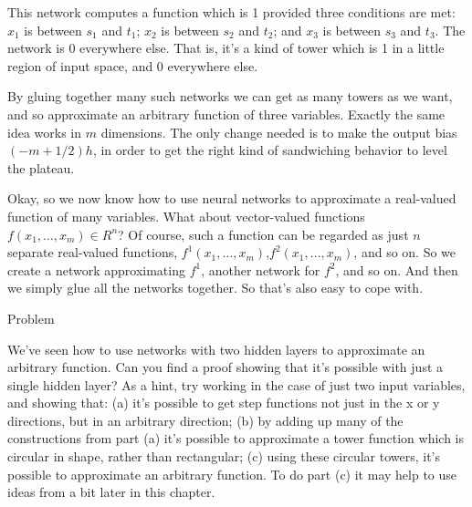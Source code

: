 \documentclass[a4paper,twoside,10pt]{book}
\begin{document}
This network computes a function which is 1 provided three conditions are met: $x_1$ is between $s_1$ and $t_1$; $x_2$ is between $s_2$ and $t_2$; and $x_3$ is between $s_3$ and $t_3$. The network is 0 everywhere else. That is, it's a kind of tower which is 1 in a little region of input space, and 0 everywhere else.

By gluing together many such networks we can get as many towers as we want, and so approximate an arbitrary function of three variables. Exactly the same idea works in $m$ dimensions. The only change needed is to make the output bias $(-m+1/2)h$, in order to get the right kind of sandwiching behavior to level the plateau.

Okay, so we now know how to use neural networks to approximate a real-valued function of many variables. What about vector-valued functions $f(x_1,\ldots,x_m)\in R^n$? Of course, such a function can be regarded as just $n$ separate real-valued functions, $f^1(x_1,\ldots,x_m)$,$f^2(x_1,\ldots,x_m)$, and so on. So we create a network approximating $f^1$, another network for $f^2$, and so on. And then we simply glue all the networks together. So that's also easy to cope with.

\begin{exercize}{Problem}
\item We've seen how to use networks with two hidden layers to approximate an arbitrary function. Can you find a proof showing that it's possible with just a single hidden layer? As a hint, try working in the case of just two input variables, and showing that: (a) it's possible to get step functions not just in the x or y directions, but in an arbitrary direction; (b) by adding up many of the constructions from part (a) it's possible to approximate a tower function which is circular in shape, rather than rectangular; (c) using these circular towers, it's possible to approximate an arbitrary function. To do part (c) it may help to use ideas from a bit later in this chapter.
\end{exercize}
\end{document}
